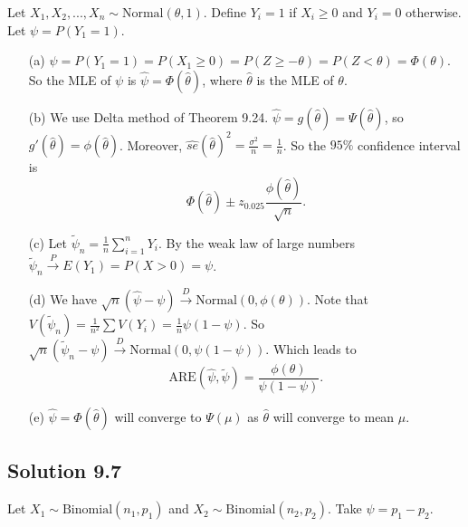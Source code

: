 Let $X_1, X_2, ..., X_n \sim \mathrm{Normal}(\theta, 1)$.
Define $Y_i = 1$ if $X_i \geq 0$ and $Y_i = 0$ otherwise.
Let $\psi = P(Y_1 = 1)$.
\begin{itemize}
    \item[(a)] $\psi = P(Y_1 = 1) = P(X_1 \geq 0) = P(Z \geq -\theta) = P(Z < \theta) = \Phi(\theta)$.
        So the MLE of $\psi$ is $\hat{\psi} = \Phi(\hat{\theta})$, where $\hat{\theta}$ is the MLE of $\theta$.
    \item[(b)] We use Delta method of Theorem 9.24.
        $\hat{\psi} = g(\hat{\theta}) = \Psi(\hat{\theta})$, so $g'(\hat{\theta}) = \phi(\hat{\theta})$.
        Moreover, $\hat{se}(\hat{\theta})^2 = \frac{\sigma^2}{n} = \frac{1}{n}$.
        So the $95\%$ confidence interval is
        \begin{equation*}
            \Phi(\hat{\theta}) \pm z_{0.025} \frac{\phi(\hat{\theta})}{\sqrt{n}}.
        \end{equation*}
    \item[(c)] Let $\tilde{\psi}_n = \frac{1}{n} \sum_{i = 1}^{n} Y_i$.
        By the weak law of large numbers $\tilde{\psi}_n \xrightarrow{P} E(Y_1) = P(X > 0) = \psi$.
    \item[(d)] We have $\sqrt{n}(\hat{\psi} - \psi) \xrightarrow{D} \mathrm{Normal}(0, \phi(\theta))$.
        Note that $V(\tilde{\psi}_n) = \frac{1}{n^2} \sum V(Y_i) = \frac{1}{n} \psi(1 - \psi)$.
        So $\sqrt{n}(\tilde{\psi}_n - \psi) \xrightarrow{D} \mathrm{Normal}(0, \psi(1 - \psi))$.
        Which leads to
        \begin{equation*}
            \mathrm{ARE}(\hat{\psi}, \tilde{\psi}) = \frac{\phi(\theta)}{\psi(1 - \psi)}.
        \end{equation*}
    \item[(e)] $\hat{\psi} = \Phi(\hat{\theta})$ will converge to $\Psi(\mu)$ as $\hat{\theta}$ will converge to mean $\mu$.
\end{itemize}


\subsection*{Solution 9.7}

Let $X_1 \sim \mathrm{Binomial}(n_1, p_1)$ and $X_2 \sim \mathrm{Binomial}(n_2, p_2)$.
Take $\psi = p_1 - p_2$.

